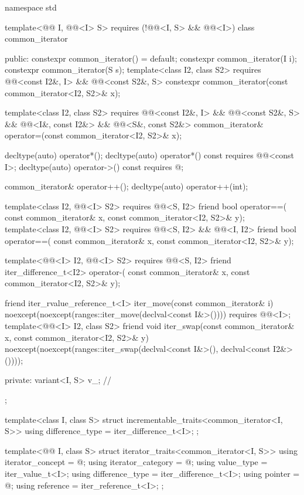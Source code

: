 %
\begin{codeblock}
namespace std {
  template<@@ I, @@<I> S>
    requires (!@@<I, S> && @@<I>)
  class common_iterator {
  public:
    constexpr common_iterator() = default;
    constexpr common_iterator(I i);
    constexpr common_iterator(S s);
    template<class I2, class S2>
      requires @@<const I2&, I> && @@<const S2&, S>
        constexpr common_iterator(const common_iterator<I2, S2>& x);

    template<class I2, class S2>
      requires @@<const I2&, I> && @@<const S2&, S> &&
               @@<I&, const I2&> && @@<S&, const S2&>
        common_iterator& operator=(const common_iterator<I2, S2>& x);

    decltype(auto) operator*();
    decltype(auto) operator*() const
      requires @@<const I>;
    decltype(auto) operator->() const
      requires @\seebelow@;

    common_iterator& operator++();
    decltype(auto) operator++(int);

    template<class I2, @@<I> S2>
      requires @@<S, I2>
    friend bool operator==(
      const common_iterator& x, const common_iterator<I2, S2>& y);
    template<class I2, @@<I> S2>
      requires @@<S, I2> && @@<I, I2>
    friend bool operator==(
      const common_iterator& x, const common_iterator<I2, S2>& y);

    template<@@<I> I2, @@<I> S2>
      requires @@<S, I2>
    friend iter_difference_t<I2> operator-(
      const common_iterator& x, const common_iterator<I2, S2>& y);

    friend iter_rvalue_reference_t<I> iter_move(const common_iterator& i)
      noexcept(noexcept(ranges::iter_move(declval<const I&>())))
        requires @@<I>;
    template<@@<I> I2, class S2>
      friend void iter_swap(const common_iterator& x, const common_iterator<I2, S2>& y)
        noexcept(noexcept(ranges::iter_swap(declval<const I&>(), declval<const I2&>())));

  private:
    variant<I, S> v_;   // \expos
  };

  template<class I, class S>
  struct incrementable_traits<common_iterator<I, S>> {
    using difference_type = iter_difference_t<I>;
  };

  template<@@ I, class S>
  struct iterator_traits<common_iterator<I, S>> {
    using iterator_concept = @\seebelow@;
    using iterator_category = @\seebelow@;
    using value_type = iter_value_t<I>;
    using difference_type = iter_difference_t<I>;
    using pointer = @\seebelow@;
    using reference = iter_reference_t<I>;
  };
}
\end{codeblock}

